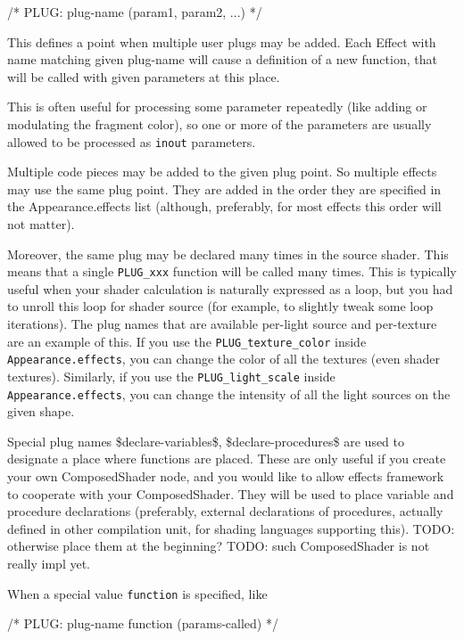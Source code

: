 \documentclass{acmsiggraph}                     %
\newenvironment{mycode}
{\begin{mycodecore}}
{\end{mycodecore}
\vspace{-0.1in}}
\begin{document}
\begin{mycode}
/* PLUG: plug-name (param1, param2, ...) */
\end{mycode}

This defines a point when multiple user plugs may be added. Each
Effect with name matching given plug-name will cause a
definition of a new function, that will be called with given parameters
at this place.

This is often useful for processing some parameter
repeatedly (like adding or modulating the fragment color),
so one or more of the parameters are usually allowed to be processed
as \texttt{inout} parameters.

Multiple code pieces may be added to the given plug point.
So multiple effects may use the same plug point. They are added
in the order they are specified in the Appearance.effects list
(although, preferably, for most effects this order will not matter).

Moreover, the same plug may be declared many times in the source shader.
This means that a single \texttt{PLUG\_xxx} function will be called
many times. This is typically useful when your shader calculation is naturally
expressed as a loop, but you had to unroll this loop for shader source
(for example, to slightly tweak some loop iterations).
The plug names that are available per-light source and per-texture
are an example of this. If you use the \texttt{PLUG\_texture\_color}
inside \texttt{Appearance.effects}, you can change the color of all
the textures (even shader textures).
Similarly, if you use the \texttt{PLUG\_light\_scale}
inside \texttt{Appearance.effects}, you can change the intensity
of all the light sources on the given shape.

Special plug names \$declare-variables\$, \$declare-procedures\$
are used to designate a place where functions are placed.
These are only useful if you create your own ComposedShader node,
and you would like to allow effects framework to cooperate with
your ComposedShader. They will be used to place
variable and procedure declarations (preferably, external declarations
of procedures, actually defined in other compilation unit,
for shading languages supporting this).
TODO: otherwise place them at the beginning?
TODO: such ComposedShader is not really impl yet.

When a special value \texttt{function} is specified, like

\begin{mycode}
/* PLUG: plug-name function (params-called) */
\end{mycode}
\end{document}
